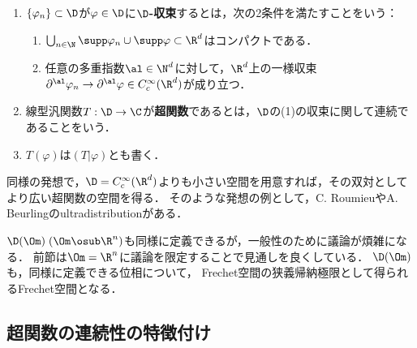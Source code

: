 \documentclass[uplatex,dvipdfmx]{jsreport}
\begin{document}
\begin{definition}\mbox{}\label{def-topology-in-D}
    \begin{enumerate}
        \item $\{\varphi_n\}\subset\D$が$\varphi\in\D$に\textbf{$\D$-収束}するとは，次の2条件を満たすことをいう：
        \begin{enumerate}
            \item $\bigcup_{n\in\N}\supp\varphi_n\cup\supp\varphi\subset\R^d$はコンパクトである．
            \item 任意の多重指数$\al\in\N^d$に対して，$\R^d$上の一様収束$\partial^\al\varphi_n\to\partial^\al\varphi\in C_c^\infty(\R^d)$が成り立つ．
        \end{enumerate}
        \item 線型汎関数$T:\D\to\C$が\textbf{超関数}であるとは，$\D$の(1)の収束に関して連続であることをいう．
        \item $T(\varphi)$は$(T|\varphi)$とも書く．
    \end{enumerate}
\end{definition}

\begin{remarks}
    同様の発想で，$\D=C_c^\infty(\R^d)$よりも小さい空間を用意すれば，その双対としてより広い超関数の空間を得る．
    そのような発想の例として，C. RoumieuやA. Beurlingのultradistributionがある．
\end{remarks}

\begin{remark}[一般化への途]
    $\D(\Om)\;(\Om\osub\R^n)$も同様に定義できるが，一般性のために議論が煩雑になる．
    前節は$\Om=\R^n$に議論を限定することで見通しを良くしている．
    $\D(\Om)$も，同様に定義できる位相について，
    Frechet空間の狭義帰納極限として得られるFrechet空間となる\cite{小松超関数}．
\end{remark}

\subsection{超関数の連続性の特徴付け}
\end{document}
